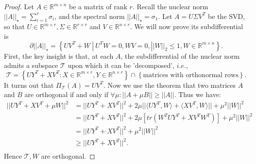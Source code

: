 \documentclass[11pt]{article}
\begin{document}
\begin{proof}
Let $A\in\mathbb{R}^{m\times n}$ be a matrix of rank $r$. Recall the nuclear norm $||A||_\star = \sum\limits_{i=1}^{r}\sigma_i$, and the spectral norm $||A||_\star = \sigma_1$. Let $A = U\Sigma V^{T}$ be the SVD, so that $U\in\mathbb{R}^{m \times r}, \Sigma\in\mathbb{R}^{r \times r}$ and $V\in\mathbb{R}^{n \times r}.$ We will now prove its subdifferential is
\begin{equation}
    \label{4.1}\tag{4.1}
    \partial||A||_\star = \left\{UV^{T} + W\ | \ U^{T}W = 0, WV = 0, ||W||_2 \leq 1, W\in\mathbb{R}^{m\times n}\right\}.
\end{equation}
First, the key insight is that, at each $A$, the subdifferential of the nuclear norm admits a subspace $\mathcal{T}$ upon which it can be 'decomposed', $i.e.$, 
\[
\mathcal{T} = \left\{UY^{T} + XV^{T} : X\in\mathbb{R}^{m\times r}, Y\in\mathbb{R}^{n\times r}\right\} \cap \left\{\text{matrices with orthonormal rows}\right\}.
\]
It turns out that $\Pi_{\mathcal{T}}(A) = UV^{T}$. Now we use the theorem that two matrices $A$ and $B$ are orthogonal if and only if $\forall\mu : ||A+\mu B||\geq ||A||$. Thus we have:
\begin{equation*}
    \begin{aligned}
        ||UY^{T}+XV^{T}+\mu W||^2 & = ||UY^{T}+XV^{T}||^2 + 2\mu||\langle UY^{T},W                              \rangle+\langle XV^{T},W \rangle|| + \mu^2||W||^2 \\
                                  & = ||UY^{T}+XV^{T}||^2 + 
                                  2\mu[tr(W^{T}UY^{T}+XV^{T}W^{T})] + \mu^2||W||^2 \\
                                  & = ||UY^{T}+XV^{T}||^2 + \mu^2||W||^2 \\
                                  & \geq ||UY^{T}+XV^{T}||^2. \\
    \end{aligned}
\end{equation*}
Hence $\mathcal{T}, W$ are orthogonal.


\end{proof}
\end{document}
